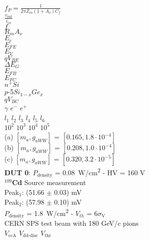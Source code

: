 \documentclass[a4paper, 11pt, twoside]{report}
\begin{document}
	
	$ f_P = \frac{1}{2\pi Z_{in} {\left( 1 + A_\nu \right)C_f}}$ \\
	
	$\frac{v_{out}}{i_{in}}$ \\
	
	$f$ \\
	
	$R_{in} A_{\nu}$ \\
	
	$E_c$\\
	
	$E_{FE}$\\
	
	$E_V$\\
	
	$qV_{BE}$\\
	
	$\Delta E_G$\\
	
	$E_{FB}$\\
	
	$E_{FC}$\\
	
	$n^+ Si$\\
	
	$p$-5$Si_{1-x} Ge_x$\\
	
	$qV_{BC}$\\
	

	$\gamma$
	$e^-$
	$e^+$\\
	
	$l_1$ $l_2$ $l_3$ $l_4$ $l_5$ $l_6$\\
	
	$10^2$ $10^3$ $10^4$ $10^5$ \\
	
	(a) $\left[m_a, g_{aWW}\right]$ = $\left[0.165, 1.8\cdot 10^{-4}\right]$ \\
	
	(b) $\left[m_a, g_{aWW}\right]$ = $\left[0.208, 1.0\cdot 10^{-4}\right]$ \\
	
	(c) $\left[m_a, g_{aWW}\right]$ = $\left[0.320, 3.2\cdot 10^{-5}\right]$ \\
	
	\textbf{DUT 0}: $P_{\text{density}}$ = \SI{0.08}{\watt/\centi\meter^2} - HV = 160 V \\
	
	$^{109}$\textbf{Cd} Source measurement \\
	
	Peak$_1$: (51.66 $\pm$ 0.03) mV \\
	
	Peak$_2$: (57.98 $\pm$ 0.10) mV \\
	
	$P_{\text{density}}$ = \SI{1.8}{\watt/\centi\meter^2} - $V_{th}$ = 6$\sigma_{\text{V}}$ \\
	
	CERN SPS test beam with 180 GeV/c pions \\
	
	$V_{\text{ccA}}$ $V_{\text{dd-disc}}$ $V_{\text{thr}}$
	

	
\end{document}

